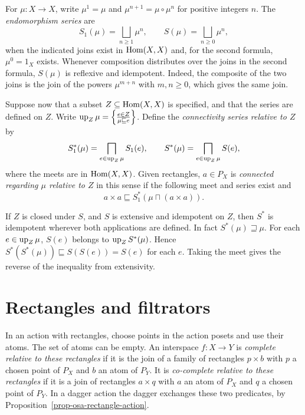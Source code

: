 \begin{defn}\label{def-osa-series}
For $\mu:X\to X$, write $\mu^1=\mu$ and
$\mu^{n+1}=\mu\circ\mu^n$ for positive integers $n$. The
\emph{endomorphism series} are
\[
 S_1(\mu)=\bigsqcup_{n\ge1}\mu^n,
 \qquad
 S(\mu)=\bigsqcup_{n\ge0}\mu^n,
\]
when the indicated joins exist in $\operatorname{Hom}(X,X)$ and, for the second
formula, $\mu^0=1_X$ exists. Whenever composition distributes over the
joins in the second formula, $S(\mu)$ is reflexive and idempotent.
Indeed, the composite of the two joins is the join of the powers
$\mu^{m+n}$ with $m,n\ge0$, which gives the same join.

Suppose now that a subset $Z\subseteq\operatorname{Hom}(X,X)$ is specified,
and that the series are defined on $Z$. Write
$\operatorname{up}_Z\mu=\left\{ \frac{e\in Z}{\mu\sqsubseteq e}\right\}$.
Define the \emph{connectivity series relative to $Z$} by
\[
 S_1^\ast(\mu)=\bigsqcap_{e\in\operatorname{up}_Z\mu} S_1(e),\qquad
 S^\ast(\mu)=\bigsqcap_{e\in\operatorname{up}_Z\mu} S(e),
\]
where the meets are in $\operatorname{Hom}(X,X)$. Given rectangles,
$a\in P_X$ is \emph{connected regarding $\mu$ relative to $Z$} in
this sense if the following meet and series exist and
\[
 a\times a\sqsubseteq S_1^\ast(\mu\sqcap(a\times a)).
\]
\end{defn}

If $Z$ is closed under $S$, and $S$ is extensive and idempotent on
$Z$, then $S^\ast$ is idempotent wherever both applications are
defined. In fact $S^\ast(\mu)\sqsupseteq\mu$. For each $e\in\operatorname{up}_Z\mu$,
$S(e)$ belongs to $\operatorname{up}_Z S^\ast(\mu)$. Hence
$S^\ast(S^\ast(\mu))\sqsubseteq S(S(e))=S(e)$ for each $e$.
Taking the meet gives the reverse of the inequality from extensivity.

\section{Rectangles and filtrators}
\label{sec-osa-rectangles-topology}

\begin{defn}\label{def-osa-rectangle-complete}
In an action with rectangles, choose points in the action posets
and use their atoms. The set of atoms can be empty. An interspace $f:X\to Y$ is
\emph{complete relative to these rectangles} if it is the join
of a family of rectangles $p\times b$ with $p$ a chosen point of
$P_X$ and $b$ an atom of $P_Y$. It is \emph{co-complete relative
to these rectangles} if it is a join of rectangles $a\times q$
with $a$ an atom of $P_X$ and $q$ a chosen point of $P_Y$.
In a dagger action the dagger exchanges these two predicates,
by Proposition~\ref{prop-osa-rectangle-action}.
\end{defn}

